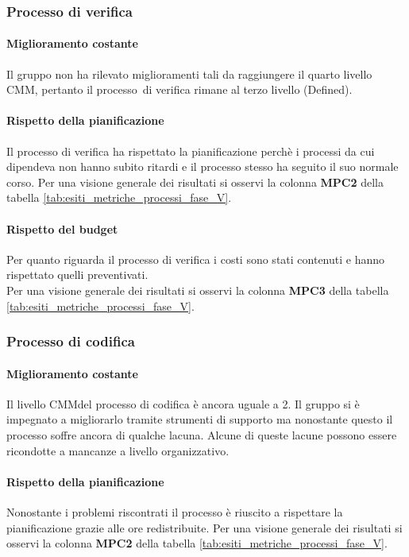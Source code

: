 \documentclass[../PianoDiQualifica.tex]{subfiles}
\begin{document}
\begin{appendices}
		\subsubsection{Processo di verifica}
			\paragraph{Miglioramento costante}
			Il gruppo non ha rilevato miglioramenti tali da raggiungere il quarto livello CMM\g, pertanto il processo\g\ di verifica rimane al terzo livello (Defined).
			
			\paragraph{Rispetto della pianificazione}
			Il processo di verifica ha rispettato la pianificazione perchè i processi da cui dipendeva non hanno subito ritardi e il processo stesso ha seguito il suo normale corso.
			Per una visione generale dei risultati si osservi la colonna \textbf{MPC2}  della tabella \ref{tab:esiti_metriche_processi_fase_V}.
			
			\paragraph{Rispetto del budget}
			Per quanto riguarda il processo di verifica i costi sono stati contenuti e hanno rispettato quelli preventivati.\\
			Per una visione generale dei risultati si osservi la colonna \textbf{MPC3}  della tabella \ref{tab:esiti_metriche_processi_fase_V}.
	
		\subsubsection{Processo di codifica}
			\paragraph{Miglioramento costante}
			Il livello CMM\g del processo di codifica è ancora uguale a 2. Il gruppo si è impegnato a migliorarlo tramite strumenti di supporto ma nonostante questo il processo soffre ancora di qualche lacuna. Alcune di queste lacune possono essere ricondotte a mancanze a livello organizzativo.\\
			
			\paragraph{Rispetto della pianificazione}
			Nonostante i problemi riscontrati il processo è riuscito a rispettare la pianificazione grazie alle ore redistribuite.
			Per una visione generale dei risultati si osservi la colonna \textbf{MPC2}  della tabella \ref{tab:esiti_metriche_processi_fase_V}.
			

\end{appendices}
\end{document}
